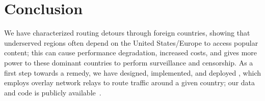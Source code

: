 \section{Conclusion}
\label{conclusion}

We have characterized routing
detours through foreign countries, showing 
that underserved regions often depend on the United States/Europe to 
access popular content; this can cause performance degradation, increased costs, 
and gives more power to these dominant countries to perform surveillance and censorship.   %
As a first step towards a remedy, we have
designed, implemented, and deployed \system{}, which employs overlay network
relays to route traffic around a given country; our data and code is publicly available~\cite{ransom_data,ran_system}.  %


